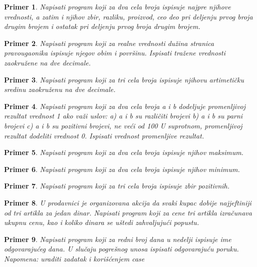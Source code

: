 \documentclass[a4paper]{article}
\newtheorem{primer}{Primer}[section]
\begin{document}
\begin{primer}
Napisati program koji za dva cela broja ispisuje najpre
njihove vrednosti, a zatim i njihov zbir, razliku, proizvod, ceo deo pri deljenju
prvog broja drugim brojem i ostatak pri deljenju prvog broja drugim brojem. 
\end{primer}


\begin{primer}
Napisati program koji za realne vrednosti dužina
stranica pravougaonika ispisuje njegov obim i površinu. Ispisati tražene vrednosti
zaokružene na dve decimale. 
\end{primer}

\begin{primer}
Napisati program koji za tri cela broja ispisuje
njihovu artimetičku sredinu zaokruženu na dve decimale.
\end{primer}

\begin{primer}
Napisati program koji za dva cela broja a i b dodeljuje
promenljivoj rezultat vrednost 1 ako važi uslov:
a) a i b su različiti brojevi
b) a i b su parni brojevi
c) a i b su pozitivni brojevi, ne veći od 100
U suprotnom, promenljivoj rezultat dodeliti vrednost 0. Ispisati vrednost promenljive
rezultat.
\end{primer}

\begin{primer}
Napisati program koji za dva cela broja ispisuje
njihov maksimum.
\end{primer}

\begin{primer}
Napisati program koji za dva cela broja ispisuje
njihov minimum.
\end{primer}

\begin{primer}
Napisati program koji za tri cela broja ispisuje zbir
pozitivnih.
\end{primer}

\begin{primer}
U prodavnici je organizovana akcija da svaki kupac dobije
najjeftiniji od tri artikla za jedan dinar. Napisati program koji za cene
tri artikla izračunava ukupnu cenu, kao i koliko dinara se uštedi zahvaljujući
popustu.
\end{primer}


\begin{primer}
Napisati program koji za redni broj dana u nedelji ispisuje
ime odgovarajućeg dana. U slučaju pogrešnog unosa ispisati odgovarajuću
poruku. Napomena: uraditi zadatak i korišćenjem case
\end{primer}
\end{document}
